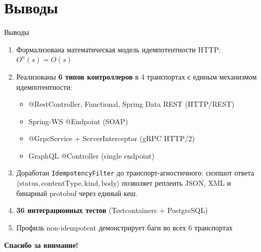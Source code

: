 \documentclass[aspectratio=169]{beamer}
\begin{document}
\section{Выводы}
\begin{frame}{Выводы}
\begin{enumerate}
    \item Формализована математическая модель идемпотентности HTTP: $O^n(s) = O(s)$
    \item Реализованы \textbf{6 типов контроллеров} в 4 транспортах с единым механизмом идемпотентности:
    \begin{itemize}
        \scriptsize
        \item @RestController, Functional, Spring Data REST (HTTP/REST)
        \item Spring-WS @Endpoint (SOAP)
        \item @GrpcService + ServerInterceptor (gRPC HTTP/2)
        \item GraphQL @Controller (single endpoint)
    \end{itemize}
    \item Доработан \texttt{IdempotencyFilter} до транспорт-агностичного: снэпшот ответа $\langle \text{status}, \text{contentType}, \text{kind}, \text{body} \rangle$ позволяет реплеить JSON, XML и бинарный protobuf через единый кеш.
    \item \textbf{36 интеграционных тестов} (Testcontainers + PostgreSQL)
    \item Профиль non-idempotent демонстрирует баги во всех 6 транспортах
\end{enumerate}

\vspace{3mm}
\centering
\textbf{Спасибо за внимание!}
\end{frame}
\end{document}
